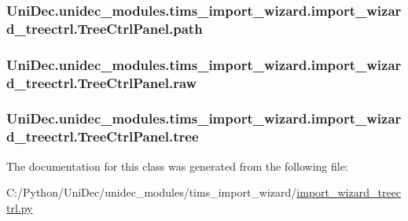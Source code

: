 \subsubsection[{path}]{\setlength{\rightskip}{0pt plus 5cm}Uni\+Dec.\+unidec\+\_\+modules.\+tims\+\_\+import\+\_\+wizard.\+import\+\_\+wizard\+\_\+treectrl.\+Tree\+Ctrl\+Panel.\+path}\label{class_uni_dec_1_1unidec__modules_1_1tims__import__wizard_1_1import__wizard__treectrl_1_1_tree_ctrl_panel_ab61d4c43003fef6a9ba461f0559b8a6c}
\hypertarget{class_uni_dec_1_1unidec__modules_1_1tims__import__wizard_1_1import__wizard__treectrl_1_1_tree_ctrl_panel_a1a010deabae45f0a442d61aa1591c281}{}
\subsubsection[{raw}]{\setlength{\rightskip}{0pt plus 5cm}Uni\+Dec.\+unidec\+\_\+modules.\+tims\+\_\+import\+\_\+wizard.\+import\+\_\+wizard\+\_\+treectrl.\+Tree\+Ctrl\+Panel.\+raw}\label{class_uni_dec_1_1unidec__modules_1_1tims__import__wizard_1_1import__wizard__treectrl_1_1_tree_ctrl_panel_a1a010deabae45f0a442d61aa1591c281}
\hypertarget{class_uni_dec_1_1unidec__modules_1_1tims__import__wizard_1_1import__wizard__treectrl_1_1_tree_ctrl_panel_a8f6a2da972779d7f2eb778eb828a5e03}{}
\subsubsection[{tree}]{\setlength{\rightskip}{0pt plus 5cm}Uni\+Dec.\+unidec\+\_\+modules.\+tims\+\_\+import\+\_\+wizard.\+import\+\_\+wizard\+\_\+treectrl.\+Tree\+Ctrl\+Panel.\+tree}\label{class_uni_dec_1_1unidec__modules_1_1tims__import__wizard_1_1import__wizard__treectrl_1_1_tree_ctrl_panel_a8f6a2da972779d7f2eb778eb828a5e03}


The documentation for this class was generated from the following file\+:\begin{DoxyCompactItemize}
\item 
C\+:/\+Python/\+Uni\+Dec/unidec\+\_\+modules/tims\+\_\+import\+\_\+wizard/\hyperlink{import__wizard__treectrl_8py}{import\+\_\+wizard\+\_\+treectrl.\+py}\end{DoxyCompactItemize}
